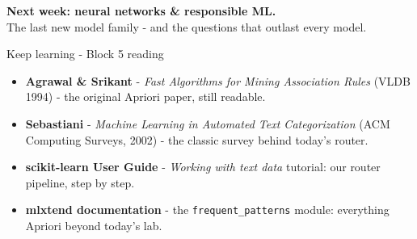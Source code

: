 \documentclass[10pt,aspectratio=169]{beamer}
\begin{document}
\begin{frame}[plain]
  \begin{center}
    \vspace{1.5cm}
    {\LARGE\textbf{Next week: neural networks \& responsible ML.}}\\[0.6cm]
    {\normalsize The last new model family - and the questions that
    outlast every model.}
  \end{center}
\end{frame}

\begin{frame}{Keep learning - Block 5 reading}
  \begin{itemize}
    \item \textbf{Agrawal \& Srikant} - \emph{Fast Algorithms for Mining
          Association Rules} (VLDB 1994) - the original Apriori paper,
          still readable.
    \item \textbf{Sebastiani} - \emph{Machine Learning in Automated Text
          Categorization} (ACM Computing Surveys, 2002) - the classic
          survey behind today's router.
    \item \textbf{scikit-learn User Guide} - \emph{Working with text data}
          tutorial: our router pipeline, step by step.
    \item \textbf{mlxtend documentation} - the \texttt{frequent\_patterns}
          module: everything Apriori beyond today's lab.
  \end{itemize}
\end{frame}
\end{document}
